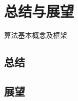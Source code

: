

\chapter{总结与展望}
\label{cha:kcbp-collision-detection}
算法基本概念及框架

\section{总结}
\label{sec:gen-normals}

\section{展望}
\label{sec:search-planes}
